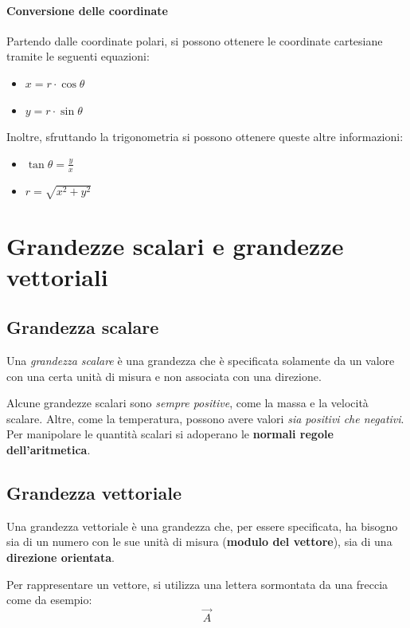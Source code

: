 \documentclass[a4paper,11pt,oneside]{book}
\begin{document}
\paragraph{Conversione delle coordinate} Partendo dalle coordinate polari, si possono ottenere le coordinate cartesiane
tramite le seguenti equazioni:
\begin{itemize}
    \item $x = r \cdot \cos{\theta}$
    \item $y = r \cdot \sin{\theta}$
\end{itemize}
Inoltre, sfruttando la trigonometria si possono ottenere queste altre informazioni:
\begin{itemize}
    \item $\tan{\theta} = \frac{y}{x}$
    \item $r = \sqrt{x^2 + y^2}$
\end{itemize}

\section{Grandezze scalari e grandezze vettoriali}

\subsection{Grandezza scalare}
Una \emph{grandezza scalare} è una grandezza che è specificata solamente da un valore con una certa unità di misura e non associata con una direzione.

Alcune grandezze scalari sono \emph{sempre positive}, come la massa e la velocità scalare.
Altre, come la temperatura, possono avere valori \emph{sia positivi che negativi}.
Per manipolare le quantità scalari si adoperano le \textbf{normali regole dell’aritmetica}.

\subsection{Grandezza vettoriale}
Una grandezza vettoriale è una grandezza che, per essere specificata,
ha bisogno sia di un numero con le sue unità di misura (\textbf{modulo del vettore}), sia di una \textbf{direzione orientata}.

Per rappresentare un vettore, si utilizza una lettera sormontata da una freccia come da esempio:
\begin{equation*}
    \vec{A}
\end{equation*}
\end{document}
